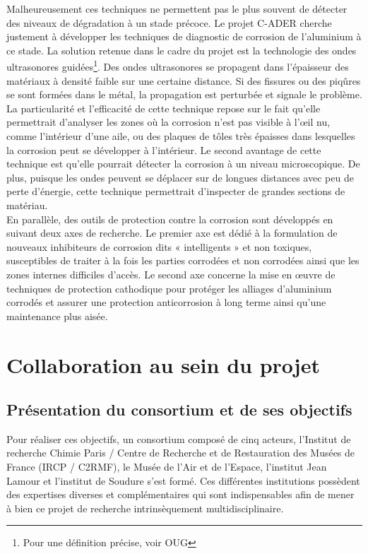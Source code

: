 Malheureusement ces techniques ne permettent pas le
plus souvent de détecter des niveaux de dégradation à un stade précoce. Le projet C-ADER cherche justement à développer les techniques de diagnostic de corrosion de l’aluminium à ce stade. La solution retenue dans le cadre du projet est la technologie des ondes ultrasonores guidées\footnote{Pour une définition précise, voir \gls{OUG}}. Des ondes ultrasonores se propagent dans l'épaisseur des matériaux à densité faible sur une certaine distance. Si des fissures ou des piqûres se sont formées dans le métal, la propagation est perturbée et signale le problème.  La particularité et l’efficacité de cette technique repose sur le fait qu’elle permettrait d’analyser les zones où la corrosion n’est pas visible à l’œil nu, comme l’intérieur d’une aile, ou des plaques de tôles très épaisses dans lesquelles la corrosion peut se développer à l’intérieur. Le second avantage de cette technique est qu’elle pourrait détecter la corrosion à un niveau microscopique. De plus, puisque les ondes peuvent se déplacer sur de longues distances avec peu de perte d'énergie, cette technique permettrait d'inspecter de grandes sections de matériau.\\ 

En parallèle, des outils de protection contre la corrosion sont développés en suivant deux axes de recherche. Le premier axe est dédié à la formulation de nouveaux inhibiteurs de corrosion dits « intelligents » et non toxiques, susceptibles de traiter à la fois les parties corrodées et non corrodées ainsi que les zones internes difficiles d'accès. Le second axe concerne la mise en œuvre de techniques de protection cathodique pour protéger les alliages d'aluminium corrodés et assurer une protection anticorrosion à long terme ainsi qu’une maintenance plus aisée.

    \section{Collaboration au sein du projet}
        \subsection{Présentation du consortium et de ses objectifs}

Pour réaliser ces objectifs, un consortium composé de cinq acteurs, l’Institut de recherche Chimie Paris / Centre de Recherche et de Restauration des Musées de France (IRCP / C2RMF), le Musée de l’Air et de l’Espace, l’institut Jean Lamour et l’institut de Soudure s’est formé. Ces différentes institutions possèdent des expertises diverses et complémentaires qui sont indispensables afin de mener à bien ce projet de recherche intrinsèquement multidisciplinaire.
        
